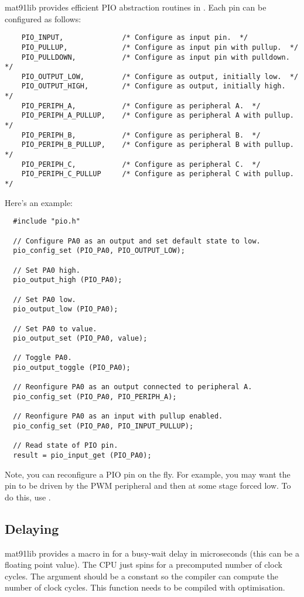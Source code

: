 mat91lib provides efficient PIO abstraction routines in
.  Each pin can be configured as follows:
%
\begin{verbatim}
    PIO_INPUT,              /* Configure as input pin.  */
    PIO_PULLUP,             /* Configure as input pin with pullup.  */
    PIO_PULLDOWN,           /* Configure as input pin with pulldown.  */
    PIO_OUTPUT_LOW,         /* Configure as output, initially low.  */
    PIO_OUTPUT_HIGH,        /* Configure as output, initially high.  */
    PIO_PERIPH_A,           /* Configure as peripheral A.  */
    PIO_PERIPH_A_PULLUP,    /* Configure as peripheral A with pullup.  */
    PIO_PERIPH_B,           /* Configure as peripheral B.  */
    PIO_PERIPH_B_PULLUP,    /* Configure as peripheral B with pullup.  */
    PIO_PERIPH_C,           /* Configure as peripheral C.  */
    PIO_PERIPH_C_PULLUP     /* Configure as peripheral C with pullup.  */
\end{verbatim}

Here's an example:
%
\begin{verbatim}
  #include "pio.h"

  // Configure PA0 as an output and set default state to low.
  pio_config_set (PIO_PA0, PIO_OUTPUT_LOW);

  // Set PA0 high.
  pio_output_high (PIO_PA0);

  // Set PA0 low.  
  pio_output_low (PIO_PA0);

  // Set PA0 to value.
  pio_output_set (PIO_PA0, value);  

  // Toggle PA0.  
  pio_output_toggle (PIO_PA0);    

  // Reonfigure PA0 as an output connected to peripheral A.
  pio_config_set (PIO_PA0, PIO_PERIPH_A);

  // Reonfigure PA0 as an input with pullup enabled.
  pio_config_set (PIO_PA0, PIO_INPUT_PULLUP);

  // Read state of PIO pin.
  result = pio_input_get (PIO_PA0);
\end{verbatim}

Note, you can reconfigure a PIO pin on the fly.  For example, you may
want the pin to be driven by the PWM peripheral and then at some stage
forced low.  To do this, use .


\subsection{Delaying}

mat91lib provides a macro  in
 for a busy-wait delay in microseconds
(this can be a floating point value).  The CPU just spins for a
precomputed number of clock cycles.  The argument should be a constant
so the compiler can compute the number of clock cycles.  This function
needs to be compiled with optimisation.

